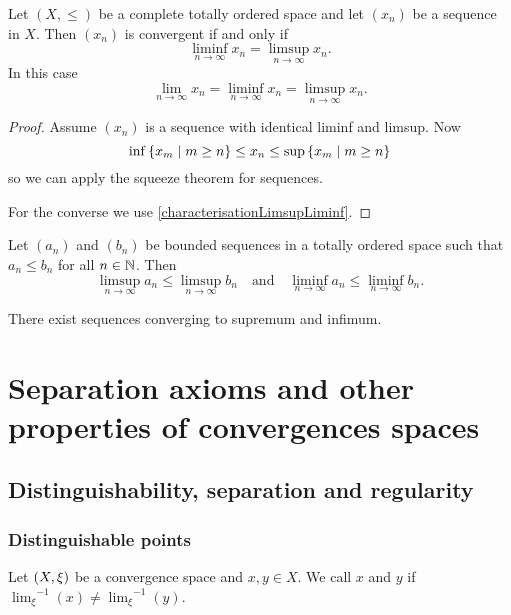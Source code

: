 \begin{proposition}
Let $(X,\leq)$ be a complete totally ordered space and let $(x_n)$ be a sequence in $X$. Then $(x_n)$ is convergent \textup{if and only if}
\[ \liminf_{n\to \infty} x_n = \limsup_{n\to \infty} x_n. \]
In this case
\[ \lim_{n\to \infty} x_n = \liminf_{n\to \infty} x_n = \limsup_{n\to \infty} x_n. \]
\end{proposition}
\begin{proof}
Assume $(x_n)$ is a sequence with identical liminf and limsup. Now
\[ \inf\setbuilder{x_m}{m\geq n} \leq x_n \leq \sup\setbuilder{x_m}{m\geq n} \]
so we can apply the squeeze theorem for sequences.

For the converse we use \ref{characterisationLimsupLiminf}.
\end{proof}

\begin{lemma} \label{monotonicityLimsupLiminf}
Let $(a_n)$ and $(b_n)$ be bounded sequences in a totally ordered space such that $a_n\leq b_n$ for all $n\in\mathbb{N}$. Then
\[ \limsup_{n\to \infty}a_n \leq \limsup_{n\to \infty}b_n \quad\text{and}\quad \liminf_{n\to \infty}a_n \leq \liminf_{n\to \infty}b_n. \]
\end{lemma}








\begin{lemma} \label{sequencesSupInf}
There exist sequences converging to supremum and infimum.
\end{lemma}










\chapter{Separation axioms and other properties of convergences spaces}

\section{Distinguishability, separation and regularity}
\subsection{Distinguishable points}
\begin{definition}
Let $\sSet{X,\xi}$ be a convergence space and $x,y\in X$. We call $x$ and $y$  if ${\lim_\xi}^{-1}(x) \neq {\lim_\xi}^{-1}(y)$.
\end{definition}

